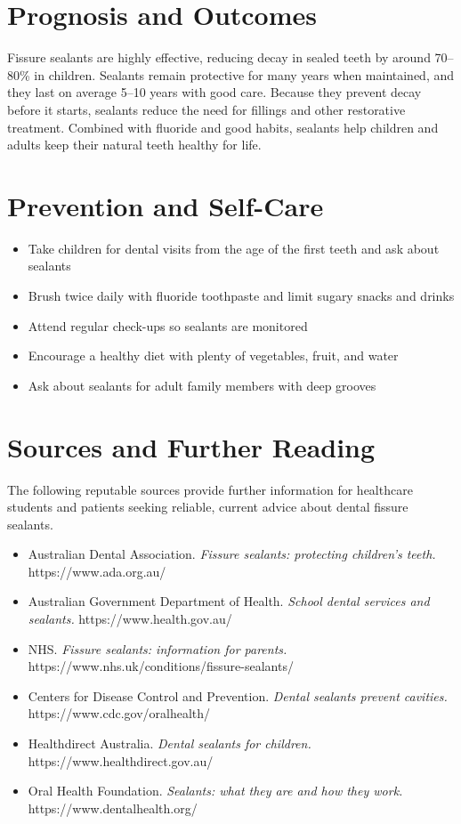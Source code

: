\section*{Prognosis and Outcomes}
Fissure sealants are highly effective, reducing decay in sealed teeth by around 70--80\% in children. Sealants remain protective for many years when maintained, and they last on average 5--10 years with good care. Because they prevent decay before it starts, sealants reduce the need for fillings and other restorative treatment. Combined with fluoride and good habits, sealants help children and adults keep their natural teeth healthy for life.

\section*{Prevention and Self-Care}
\begin{itemize}
    \item Take children for dental visits from the age of the first teeth and ask about sealants
    \item Brush twice daily with fluoride toothpaste and limit sugary snacks and drinks
    \item Attend regular check-ups so sealants are monitored
    \item Encourage a healthy diet with plenty of vegetables, fruit, and water
    \item Ask about sealants for adult family members with deep grooves
\end{itemize}

\section*{Sources and Further Reading}
The following reputable sources provide further information for healthcare students and patients seeking reliable, current advice about dental fissure sealants.

\begin{itemize}
    \item Australian Dental Association. \textit{Fissure sealants: protecting children's teeth.} https://www.ada.org.au/
    \item Australian Government Department of Health. \textit{School dental services and sealants.} https://www.health.gov.au/
    \item NHS. \textit{Fissure sealants: information for parents.} https://www.nhs.uk/conditions/fissure-sealants/
    \item Centers for Disease Control and Prevention. \textit{Dental sealants prevent cavities.} https://www.cdc.gov/oralhealth/
    \item Healthdirect Australia. \textit{Dental sealants for children.} https://www.healthdirect.gov.au/
    \item Oral Health Foundation. \textit{Sealants: what they are and how they work.} https://www.dentalhealth.org/
\end{itemize}
